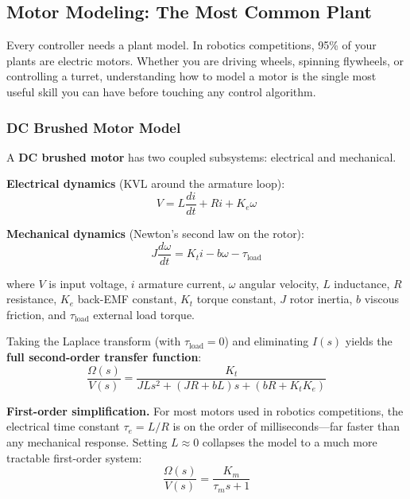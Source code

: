 \subsection{Motor Modeling: The Most Common Plant}

Every controller needs a plant model. In robotics competitions, 95\% of your plants are electric motors. Whether you are driving wheels, spinning flywheels, or controlling a turret, understanding how to model a motor is the single most useful skill you can have before touching any control algorithm.

\subsubsection*{DC Brushed Motor Model}

A \textbf{DC brushed motor} has two coupled subsystems: electrical and mechanical.

\textbf{Electrical dynamics} (KVL around the armature loop):
\begin{equation}
V = L\frac{di}{dt} + Ri + K_e\omega
\end{equation}

\textbf{Mechanical dynamics} (Newton's second law on the rotor):
\begin{equation}
J\frac{d\omega}{dt} = K_t i - b\omega - \tau_{\text{load}}
\end{equation}

where $V$ is input voltage, $i$ armature current, $\omega$ angular velocity, $L$ inductance, $R$ resistance, $K_e$ back-EMF constant, $K_t$ torque constant, $J$ rotor inertia, $b$ viscous friction, and $\tau_{\text{load}}$ external load torque.

Taking the Laplace transform (with $\tau_{\text{load}} = 0$) and eliminating $I(s)$ yields the \textbf{full second-order transfer function}:
\begin{equation}
\frac{\Omega(s)}{V(s)} = \frac{K_t}{JLs^2 + (JR + bL)s + (bR + K_t K_e)}
\end{equation}

\textbf{First-order simplification.} For most motors used in robotics competitions, the electrical time constant $\tau_e = L/R$ is on the order of milliseconds---far faster than any mechanical response. Setting $L \approx 0$ collapses the model to a much more tractable first-order system:
\begin{equation}
\frac{\Omega(s)}{V(s)} = \frac{K_m}{\tau_m s + 1}
\end{equation}

